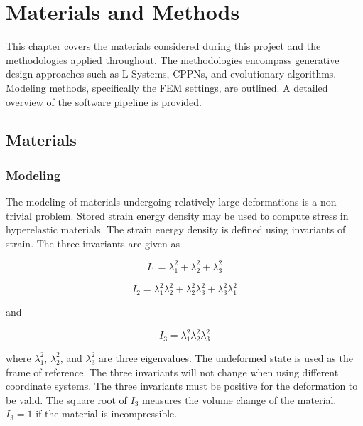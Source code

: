 \chapter{Materials and Methods}
\label{chp:MaM}


This chapter covers the materials considered during this project and the methodologies applied throughout. The methodologies encompass generative design approaches such as L-Systems, CPPNs, and evolutionary algorithms. Modeling methods, specifically the FEM settings, are outlined. A detailed overview of the software pipeline is provided.

\section{Materials}

\subsection{Modeling}

The modeling of materials undergoing relatively large deformations is a non-trivial problem. Stored strain energy density may be used to compute stress in hyperelastic materials. The strain energy density is defined using invariants of strain. The three invariants are given as \citep{Kim2015}

\begin{equation}
	I_{1}=\lambda_{1}^{2}+\lambda_{2}^{2}+\lambda_{3}^{2}
\end{equation}

\begin{equation}
	I_{2}=\lambda_{1}^{2}\lambda_{2}^{2}+\lambda_{2}^{2}\lambda_{3}^{2}+\lambda_{3}^{2}\lambda_{1}^{2}
\end{equation}

and

\begin{equation}
	I_{3}=\lambda_{1}^{2}\lambda_{2}^{2}\lambda_{3}^{2}
\end{equation}

where $\lambda_{1}^{2}$, $\lambda_{2}^{2}$, and $\lambda_{3}^{2}$ are three eigenvalues. The undeformed state is used as the frame of reference. The three invariants will not change when using different coordinate systems. The three invariants must be positive for the deformation to be valid. The square root of $I_{3}$ measures the volume change of the material. $I_{3}=1$ if the material is incompressible. \citep{Kim2015}

